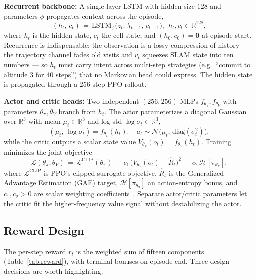 \documentclass[conference]{IEEEtran}
\begin{document}
\textbf{Recurrent backbone:} A single-layer LSTM with hidden size $128$ and parameters $\phi$ propagates context across the episode,
\begin{equation}
(h_t,\,c_t) \,=\, \mathrm{LSTM}_{\phi}\!\big(z_t;\, h_{t-1},\, c_{t-1}\big),\ \ h_t,c_t\!\in\!\mathbb{R}^{128},
\label{eq:lstm}
\end{equation}
where $h_t$ is the hidden state, $c_t$ the cell state, and $(h_0,c_0)\!=\!\mathbf{0}$ at episode start. Recurrence is indispensable: the observation is a lossy compression of history --- the trajectory channel fades old visits and $v_t$ squeezes SLAM state into ten numbers --- so $h_t$ must carry intent across multi-step strategies (e.g.\ ``commit to altitude 3 for 40 steps'') that no Markovian head could express. The hidden state is propagated through a $256$-step PPO rollout.

\textbf{Actor and critic heads:} Two independent $(256,256)$ MLPs $f_{\theta_\pi}, f_{\theta_V}$ with parameters $\theta_\pi, \theta_V$ branch from $h_t$. The actor parameterizes a diagonal Gaussian over $\mathbb{R}^3$ with mean $\mu_t\!\in\!\mathbb{R}^3$ and log-std $\log\sigma_t\!\in\!\mathbb{R}^3$,
\begin{equation}
(\mu_t,\,\log\sigma_t) = f_{\theta_\pi}(h_t),\quad a_t \sim \mathcal{N}\!\big(\mu_t,\,\mathrm{diag}(\sigma_t^2)\big),
\label{eq:actor}
\end{equation}
while the critic outputs a scalar state value $V_{\theta_V}(o_t)\!=\!f_{\theta_V}(h_t)$. Training minimizes the joint objective
\begin{equation}
\mathcal{L}(\theta_\pi,\theta_V) \,=\, \mathcal{L}^{\text{CLIP}}(\theta_\pi) \,+\, c_1\,\big(V_{\theta_V}(o_t)\!-\!\hat{R}_t\big)^2 \,-\, c_2\,\mathcal{H}[\pi_{\theta_\pi}],
\label{eq:ppo_loss}
\end{equation}
where $\mathcal{L}^{\text{CLIP}}$ is PPO's clipped-surrogate objective, $\hat{R}_t$ is the Generalized Advantage Estimation (GAE) target, $\mathcal{H}[\pi_{\theta_\pi}]$ an action-entropy bonus, and $c_1,c_2\!>\!0$ are scalar weighting coefficients~\cite{raffin2021sb3}. Separate actor/critic parameters let the critic fit the higher-frequency value signal without destabilizing the actor.

\subsection{Reward Design}\label{sec:reward}

The per-step reward $r_t$ is the weighted sum of fifteen components (Table~\ref{tab:reward}), with terminal bonuses on episode end. Three design decisions are worth highlighting.
\end{document}
